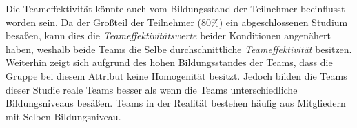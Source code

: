 \documentclass[a4paper,11pt]{article}%
\renewcommand{\\}{\vspace*{0.5\baselineskip} \newline}
\begin{document}
{{Die Teameffektivität könnte auch vom Bildungsstand der Teilnehmer beeinflusst worden sein. Da der Großteil der Teilnehmer (80\%) ein abgeschlossenen Studium besaßen, kann dies die \textit{Teameffektivitätswerte} beider Konditionen angenähert haben, weshalb beide Teams die Selbe durchschnittliche \textit{Teameffektivität} besitzen. Weiterhin zeigt sich aufgrund des hohen Bildungsstandes der Teams, dass die Gruppe bei diesem Attribut keine Homogenität besitzt. Jedoch bilden die Teams dieser Studie reale Teams besser als wenn die Teams unterschiedliche Bildungsniveaus besäßen. Teams in der Realität bestehen häufig aus Mitgliedern mit Selben Bildungsniveau.




%
	
}}
\end{document}
